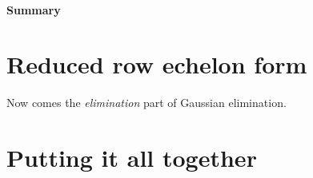 \documentclass{ximera}
\begin{document}
\paragraph{Summary}







\section{Reduced row echelon form}


Now comes the \emph{elimination} part of Gaussian elimination.

\section{Putting it all together}
\end{document}
